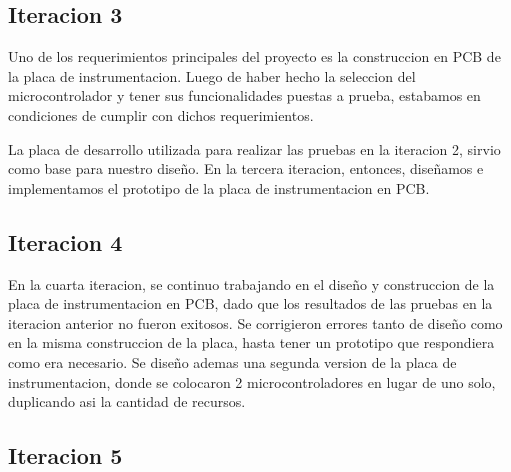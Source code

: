 \subsection{Iteracion 3} %
\label{sub:iteracion_3}

Uno de los requerimientos principales del proyecto es la construccion en PCB de la placa de instrumentacion. Luego de haber hecho la seleccion del microcontrolador y tener sus funcionalidades puestas a prueba, estabamos en condiciones de cumplir con dichos requerimientos.

La placa de desarrollo utilizada para realizar las pruebas en la iteracion 2, sirvio como base para nuestro diseño. En la tercera iteracion, entonces, diseñamos e implementamos el prototipo de la placa de instrumentacion en PCB.

\subsection{Iteracion 4} %
\label{sub:iteracion_4}

En la cuarta iteracion, se continuo trabajando en el diseño y construccion de la placa de instrumentacion en PCB, dado que los resultados de las pruebas en la iteracion anterior no fueron exitosos. Se corrigieron errores tanto de diseño como en la misma construccion de la placa, hasta tener un prototipo que respondiera como era necesario.
Se diseño ademas una segunda version de la placa de instrumentacion, donde se colocaron 2 microcontroladores en lugar de uno solo, duplicando asi la cantidad de recursos. 


\subsection{Iteracion 5} %
\label{sub:iteracion_5}

